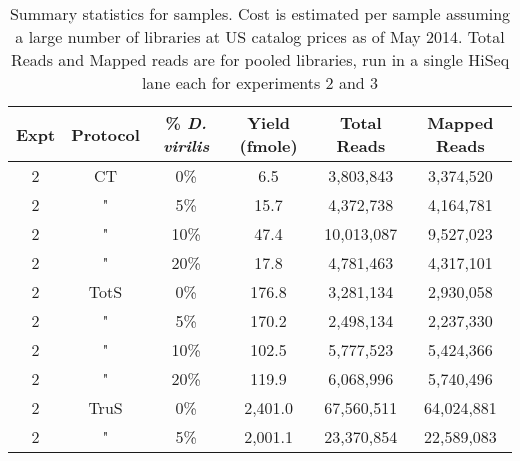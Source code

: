 \begin{table}[htdp]

\caption{Summary statistics for samples. Cost is estimated per sample assuming a
     large number of libraries at US catalog prices as of May 2014. Total Reads
     and Mapped reads are for pooled libraries, run in a single HiSeq lane each
     for experiments 2 and 3}
\begin{center}
\begin{tabular}{|c|c|c|c|c|c|} \hline
      Expt & Protocol & \% {\em D. virilis}  &  Yield (fmole) & Total Reads & Mapped Reads \\\hline 
2 & CT & 0\%  & 6.5  & 3,803,843 &3,374,520 \\
2 & " & 5\%  & 15.7  & 4,372,738 &4,164,781 \\
2 & " & 10\%  & 47.4  & 10,013,087 &9,527,023 \\
2 & " & 20\%  & 17.8  & 4,781,463 &4,317,101 \\
2 & TotS & 0\%  & 176.8  & 3,281,134 &2,930,058 \\
2 & " & 5\%  & 170.2  & 2,498,134 &2,237,330 \\
2 & " & 10\%  & 102.5  & 5,777,523 &5,424,366 \\
2 & " & 20\%  & 119.9  & 6,068,996 &5,740,496 \\
2 & TruS & 0\%  & 2,401.0  & 67,560,511 &64,024,881 \\
2 & " & 5\%  & 2,001.1  & 23,370,854 &22,589,083 \\

\end{tabular}
\end{center}
\end{table}
